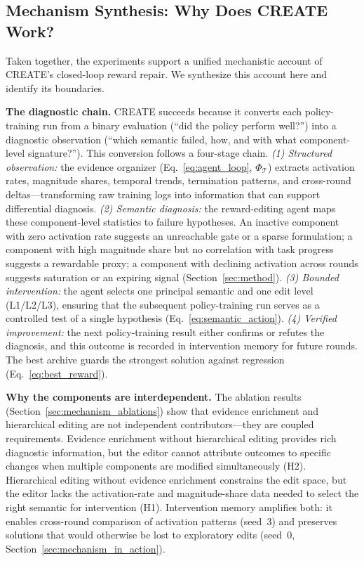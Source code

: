 \subsection{Mechanism Synthesis: Why Does CREATE Work?}
\label{sec:mechanism_synthesis}

Taken together, the experiments support a unified mechanistic account of CREATE's closed-loop reward repair. We synthesize this account here and identify its boundaries.

\textbf{The diagnostic chain.} CREATE succeeds because it converts each policy-training run from a binary evaluation (``did the policy perform well?'') into a diagnostic observation (``which semantic failed, how, and with what component-level signature?''). This conversion follows a four-stage chain. \emph{(1) Structured observation:} the evidence organizer (Eq.~\ref{eq:agent_loop}, $\Phi_{\mathcal T}$) extracts activation rates, magnitude shares, temporal trends, termination patterns, and cross-round deltas---transforming raw training logs into information that can support differential diagnosis. \emph{(2) Semantic diagnosis:} the reward-editing agent maps these component-level statistics to failure hypotheses. An inactive component with zero activation rate suggests an unreachable gate or a sparse formulation; a component with high magnitude share but no correlation with task progress suggests a rewardable proxy; a component with declining activation across rounds suggests saturation or an expiring signal (Section~\ref{sec:method}). \emph{(3) Bounded intervention:} the agent selects one principal semantic and one edit level (L1/L2/L3), ensuring that the subsequent policy-training run serves as a controlled test of a single hypothesis (Eq.~\ref{eq:semantic_action}). \emph{(4) Verified improvement:} the next policy-training result either confirms or refutes the diagnosis, and this outcome is recorded in intervention memory for future rounds. The best archive guards the strongest solution against regression (Eq.~\ref{eq:best_reward}).

\textbf{Why the components are interdependent.} The ablation results (Section~\ref{sec:mechanism_ablations}) show that evidence enrichment and hierarchical editing are not independent contributors---they are coupled requirements. Evidence enrichment without hierarchical editing provides rich diagnostic information, but the editor cannot attribute outcomes to specific changes when multiple components are modified simultaneously (H2). Hierarchical editing without evidence enrichment constrains the edit space, but the editor lacks the activation-rate and magnitude-share data needed to select the right semantic for intervention (H1). Intervention memory amplifies both: it enables cross-round comparison of activation patterns (seed~3) and preserves solutions that would otherwise be lost to exploratory edits (seed~0, Section~\ref{sec:mechanism_in_action}).


